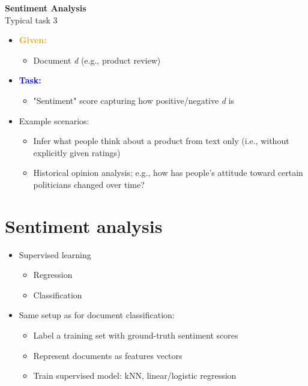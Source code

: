 \documentclass[11pt]{article}
\begin{document}
\begin{center}
  {\LARGE \textbf{Sentiment Analysis}} \\
  Typical task 3
\end{center}
\vspace{0.5cm}

\begin{itemize}
	\item \textcolor{orange}{\textbf{Given:}}
		\begin{itemize}
			\item Document \textit{d} (e.g., product review)
		\end{itemize}
	\item \textbf{\textcolor{blue}{Task:}}
		\begin{itemize}
			\item "Sentiment" score capturing how positive/negative \textit{d} is
		\end{itemize}
	\item Example scenarios:
		\begin{itemize}
			\item Infer what people think about a product from text only (i.e., without explicitly given ratings)
			\item Historical opinion analysis; e.g., how has people's attitude toward certain politicians changed over time?
		\end{itemize}
\end{itemize}
\section*{Sentiment analysis}
\begin{itemize}
	\item Supervised learning
		\begin{itemize}
			\item Regression
			\item Classification
		\end{itemize}	
	\item Same setup as for document classification:
		\begin{itemize}
			\item Label a training set with ground-truth sentiment scores
			\item Represent documents as features vectors
			\item Train supervised model: kNN, linear/logistic regression
		\end{itemize}
\end{itemize}
\end{document}
